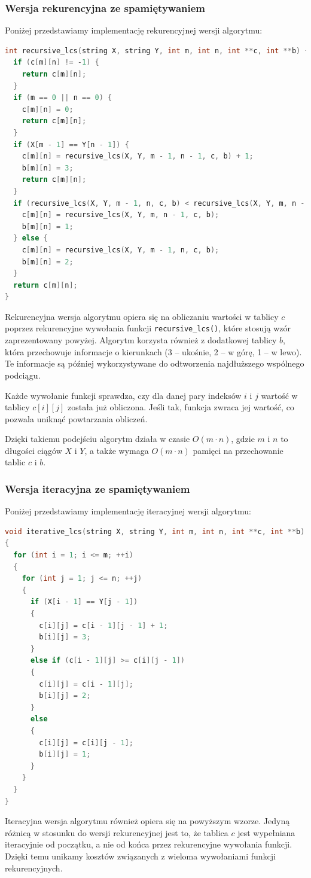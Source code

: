 \documentclass{article}
\begin{document}
\subsubsection{Wersja rekurencyjna ze spamiętywaniem}
Poniżej przedstawiamy implementację rekurencyjnej wersji algorytmu:

\begin{lstlisting}[style=mystyle, language=C++, caption={Implementacja \texttt{recursive\_lcs}}, label={lst:recursive_lcs}]
int recursive_lcs(string X, string Y, int m, int n, int **c, int **b) {
  if (c[m][n] != -1) {
    return c[m][n];
  }
  if (m == 0 || n == 0) {
    c[m][n] = 0;
    return c[m][n];
  }
  if (X[m - 1] == Y[n - 1]) {
    c[m][n] = recursive_lcs(X, Y, m - 1, n - 1, c, b) + 1;
    b[m][n] = 3;
    return c[m][n];
  }
  if (recursive_lcs(X, Y, m - 1, n, c, b) < recursive_lcs(X, Y, m, n - 1, c, b)) {
    c[m][n] = recursive_lcs(X, Y, m, n - 1, c, b);
    b[m][n] = 1;
  } else {
    c[m][n] = recursive_lcs(X, Y, m - 1, n, c, b);
    b[m][n] = 2;
  }
  return c[m][n];
}
\end{lstlisting}

Rekurencyjna wersja algorytmu opiera się na obliczaniu wartości w tablicy $c$ poprzez rekurencyjne wywołania funkcji \texttt{recursive\_lcs()}, które stosują wzór zaprezentowany powyżej. Algorytm korzysta również z dodatkowej tablicy $b$, która przechowuje informacje o kierunkach (3 – ukośnie, 2 – w górę, 1 – w lewo). Te informacje są później wykorzystywane do odtworzenia najdłuższego wspólnego podciągu. 

Każde wywołanie funkcji sprawdza, czy dla danej pary indeksów $i$ i $j$ wartość w tablicy $c[i][j]$ została już obliczona. Jeśli tak, funkcja zwraca jej wartość, co pozwala uniknąć powtarzania obliczeń.

Dzięki takiemu podejściu algorytm działa w czasie $O(m \cdot n)$, gdzie $m$ i $n$ to długości ciągów $X$ i $Y$, a także wymaga $O(m \cdot n)$ pamięci na przechowanie tablic $c$ i $b$.

\subsubsection{Wersja iteracyjna ze spamiętywaniem}
Poniżej przedstawiamy implementację iteracyjnej wersji algorytmu:
\begin{lstlisting}[style=mystyle, language=C++, caption={Implementacja \texttt{iterative\_lcs}}, label={lst:iterative_lcs}]
void iterative_lcs(string X, string Y, int m, int n, int **c, int **b)
{
  for (int i = 1; i <= m; ++i)
  {
    for (int j = 1; j <= n; ++j)
    {
      if (X[i - 1] == Y[j - 1])
      {
        c[i][j] = c[i - 1][j - 1] + 1;
        b[i][j] = 3;
      }
      else if (c[i - 1][j] >= c[i][j - 1])
      {
        c[i][j] = c[i - 1][j];
        b[i][j] = 2;
      }
      else
      {
        c[i][j] = c[i][j - 1];
        b[i][j] = 1;
      }
    }
  }
}
\end{lstlisting}
Iteracyjna wersja algorytmu również opiera się na powyższym wzorze. Jedyną różnicą w stosunku do wersji rekurencyjnej jest to, że tablica $c$ jest wypełniana iteracyjnie od początku, a nie od końca przez rekurencyjne wywołania funkcji. Dzięki temu unikamy kosztów związanych z wieloma wywołaniami funkcji rekurencyjnych.
\end{document}
